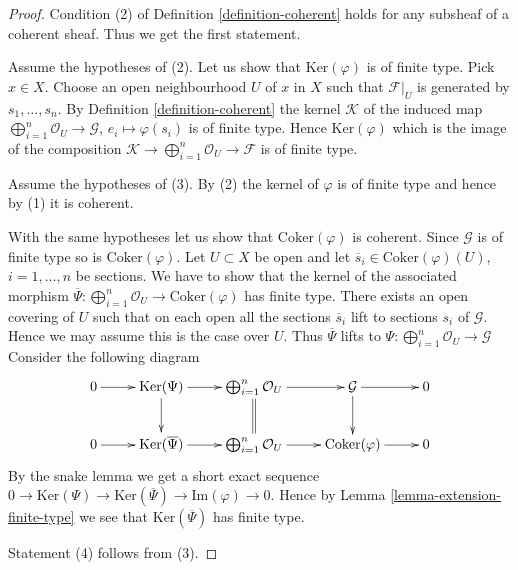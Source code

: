 \begin{proof}
Condition (2) of Definition \ref{definition-coherent}
holds for any subsheaf of a coherent sheaf. Thus we get the
first statement.

\medskip\noindent
Assume the hypotheses of (2).
Let us show that $\text{Ker}(\varphi)$ is of finite type. Pick $x \in X$.
Choose an open neighbourhood $U$ of $x$ in $X$ such
that $\mathcal{F}|_U$ is generated by $s_1, \ldots, s_n$.
By Definition \ref{definition-coherent} the kernel $\mathcal{K}$
of the induced map
$\bigoplus_{i = 1}^n \mathcal{O}_U \to \mathcal{G}$,
$e_i \mapsto \varphi(s_i)$ is of finite type.
Hence $\text{Ker}(\varphi)$ which is the image of the
composition
$\mathcal{K} \to \bigoplus_{i = 1}^n \mathcal{O}_U \to \mathcal{F}$
is of finite type.

\medskip\noindent
Assume the hypotheses of (3).
By (2) the kernel of $\varphi$ is of finite type and
hence by (1) it is coherent.

\medskip\noindent
With the same hypotheses
let us show that $\text{Coker}(\varphi)$ is coherent.
Since $\mathcal{G}$ is of finite type so is $\text{Coker}(\varphi)$.
Let $U \subset X$ be open and let
$\overline{s}_i \in \text{Coker}(\varphi)(U)$,
$i = 1, \ldots, n$ be sections. We have to show that
the kernel of the associated morphism
$\overline{\Psi} : \bigoplus_{i = 1}^n \mathcal{O}_U \to \text{Coker}(\varphi)$
has finite type.
There exists an open covering
of $U$ such that on each open all the sections $\overline{s}_i$
lift to sections $s_i$ of $\mathcal{G}$. Hence we may assume
this is the case over $U$. Thus $\overline{\Psi}$ lifts to
$\Psi : \bigoplus_{i = 1}^n \mathcal{O}_U \to \mathcal{G}$
Consider the following diagram
$$
\xymatrix{
0 \ar[r] &
\text{Ker}(\Psi) \ar[r] \ar[d] &
\bigoplus_{i = 1}^n \mathcal{O}_U \ar[r] \ar@{=}[d] &
\mathcal{G} \ar[r] \ar[d] &
0 \\
0 \ar[r] &
\text{Ker}(\overline{\Psi}) \ar[r] &
\bigoplus_{i = 1}^n \mathcal{O}_U \ar[r] &
\text{Coker}(\varphi) \ar[r] &
0
}
$$
By the snake lemma we get a short exact sequence
$0 \to \text{Ker}(\Psi) \to \text{Ker}(\overline{\Psi})
\to \text{Im}(\varphi) \to 0$. Hence by
Lemma \ref{lemma-extension-finite-type} we
see that $\text{Ker}(\overline{\Psi})$ has finite type.

\medskip\noindent
Statement (4) follows from (3).


\end{proof}
